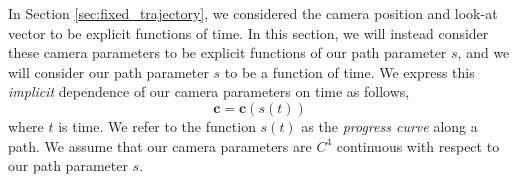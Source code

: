 \begin{Listing}[t]
\begin{algorithmic}[1]


\end{algorithmic}
\end{Listing}

In Section \ref{sec:fixed_trajectory}, we considered the camera position and look-at vector to be explicit functions of time.
In this section, we will instead consider these camera parameters to be explicit functions of our path parameter $s$, and we will consider our path parameter $s$ to be a function of time.
We express this \emph{implicit} dependence of our camera parameters on time as follows,
%
\begin{equation}
\mathbf{c} = \mathbf{c}(s(t))
\end{equation}
%
where $t$ is time.
We refer to the function $s(t)$ as the \emph{progress curve} along a path.
We assume that our camera parameters are $C^4$ continuous with respect to our path parameter $s$.

